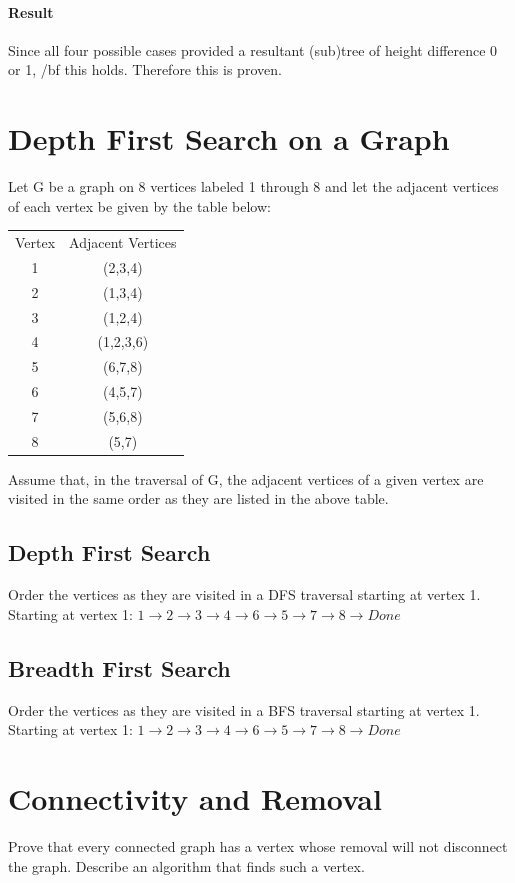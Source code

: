 \documentclass[12pt]{article}
\begin{document}
\paragraph{Result}
Since all four possible cases provided a resultant (sub)tree of height difference 0 or 1, {/bf this holds.} Therefore this is proven.

\section{Depth First Search on a Graph}
Let G be a graph on 8 vertices labeled 1 through 8 and let the adjacent vertices of each vertex be given by the table below:
\begin{center}
\begin{tabular}{ c | c }
	Vertex & Adjacent Vertices \\
	1 & (2,3,4) \\
	2 & (1,3,4) \\
	3 & (1,2,4) \\
	4 & (1,2,3,6) \\
	5 & (6,7,8) \\
	6 & (4,5,7) \\
	7 & (5,6,8) \\
	8 & (5,7) \\
\end{tabular}
\end{center}
Assume that, in the traversal of G, the adjacent vertices of a given vertex are visited in the same order as they are listed in the above table.
\subsection{Depth First Search}
Order the vertices as they are visited in a DFS traversal starting at vertex 1.\\
Starting at vertex 1:
$1 \rightarrow 2 \rightarrow 3 \rightarrow 4 \rightarrow 6 \rightarrow 5 \rightarrow 7 \rightarrow 8 \rightarrow Done$
\subsection{Breadth First Search}
Order the vertices as they are visited in a BFS traversal starting at vertex 1.\\
Starting at vertex 1:
$1 \rightarrow 2 \rightarrow 3 \rightarrow 4 \rightarrow 6 \rightarrow 5 \rightarrow 7 \rightarrow 8 \rightarrow Done$
\section{Connectivity and Removal}
Prove that every connected graph has a vertex whose removal will not disconnect the graph. Describe an algorithm that finds such a vertex.
\end{document}

